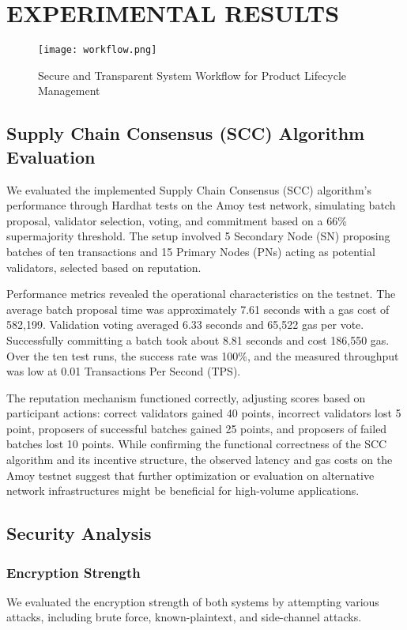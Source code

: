 \documentclass[conference]{IEEEtran}
\begin{document}
\section{EXPERIMENTAL RESULTS}

\begin{figure*}[htbp]
  \centering
  \texttt{[image: workflow.png]}
  \caption{Secure and Transparent System Workflow for Product Lifecycle Management}
  \label{fig:system-}
\end{figure*}

\subsection{Supply Chain Consensus (SCC) Algorithm Evaluation}

We evaluated the implemented Supply Chain Consensus (SCC) algorithm's performance through Hardhat tests on the Amoy test network, simulating batch proposal, validator selection, voting, and commitment based on a 66\% supermajority threshold. The setup involved 5 Secondary Node (SN) proposing batches of ten transactions and 15 Primary Nodes (PNs) acting as potential validators, selected based on reputation.

Performance metrics revealed the operational characteristics on the testnet. The average batch proposal time was approximately 7.61 seconds with a gas cost of 582,199. Validation voting averaged 6.33 seconds and 65,522 gas per vote. Successfully committing a batch took about 8.81 seconds and cost 186,550 gas. Over the ten test runs, the success rate was 100\%, and the measured throughput was low at 0.01 Transactions Per Second (TPS).

The reputation mechanism functioned correctly, adjusting scores based on participant actions: correct validators gained 40 points, incorrect validators lost 5 point, proposers of successful batches gained 25 points, and proposers of failed batches lost 10 points. While confirming the functional correctness of the SCC algorithm and its incentive structure, the observed latency and gas costs on the Amoy testnet suggest that further optimization or evaluation on alternative network infrastructures might be beneficial for high-volume applications.

\subsection{Security Analysis}
\subsubsection{Encryption Strength}
We evaluated the encryption strength of both systems by attempting various attacks, including brute force, known-plaintext, and side-channel attacks. 
\end{document}
